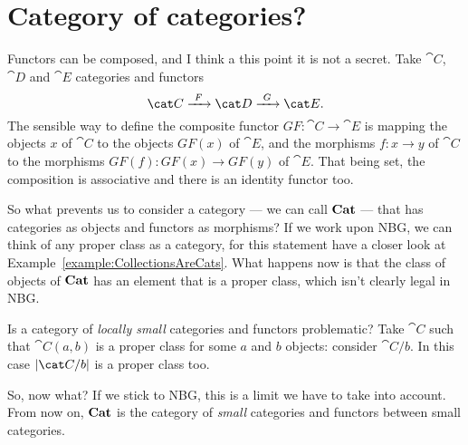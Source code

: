 
\section{Category of categories?}

Functors can be composed, and I think a this point it is not a secret. Take \(\cat C\), \(\cat D\) and \(\cat E\) categories and functors
\[\cat C \functo F \cat D \functo G \cat E .\]
The sensible way to define the composite functor \(GF : \cat C \to \cat E\) is mapping the objects \(x\) of \(\cat C\) to the objects \(GF(x)\) of \(\cat E\), and the morphisms \(f : x \to y\) of \(\cat C\) to the morphisms \(GF(f) : GF(x) \to GF(y)\) of \(\cat E\). That being set, the composition is associative and there is an identity functor too.

So what prevents us to consider a category --- we can call \(\bf Cat\) --- that has categories as objects and functors as morphisms? If we work upon NBG, we can think of any proper class as a category,  for this statement have a closer look at Example~\ref{example:CollectionsAreCats}. What happens now is that the class of objects of \(\bf Cat\) has an element that is a proper class, which isn't clearly legal in NBG.

Is a category of {\em locally small} categories and functors problematic? Take \(\cat C\) such that \(\cat C(a, b)\) is a proper class for some \(a\) and \(b\) objects: consider \(\cat C{/}{b}\). In this case \(\obj{\cat C/b}\) is a proper class too.

So, now what? If we stick to NBG, this is a limit we have to take into account. From now on, \(\bf Cat\) is the category of {\em small} categories and functors between small categories.
